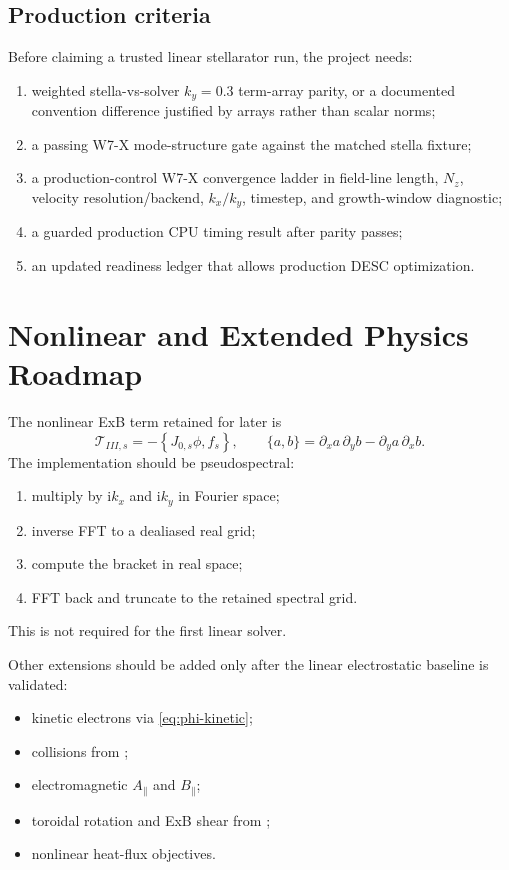 \documentclass[11pt,a4paper]{article}
\newcommand{\ii}{\mathrm{i}}
\begin{document}
\subsection{Production criteria}

Before claiming a trusted linear stellarator run, the project needs:
\begin{enumerate}
  \item weighted stella-vs-solver \(k_y=0.3\) term-array parity, or a documented
  convention difference justified by arrays rather than scalar norms;
  \item a passing W7-X mode-structure gate against the matched stella fixture;
  \item a production-control W7-X convergence ladder in field-line length,
  \(N_z\), velocity resolution/backend, \(k_x/k_y\), timestep, and growth-window
  diagnostic;
  \item a guarded production CPU timing result after parity passes;
  \item an updated readiness ledger that allows production DESC optimization.
\end{enumerate}


\section{Nonlinear and Extended Physics Roadmap}
\label{sec:nonlinear-extension}

The nonlinear ExB term retained for later is
\begin{equation}
  \mathcal{T}_{III,s}
  =
  -\left\{J_{0,s}\phi,f_s\right\},
  \qquad
  \{a,b\}
  =
  \partial_x a\,\partial_y b-\partial_y a\,\partial_x b.
  \label{eq:nonlinear-bracket}
\end{equation}
The implementation should be pseudospectral:
\begin{enumerate}
  \item multiply by \(\ii k_x\) and \(\ii k_y\) in Fourier space;
  \item inverse FFT to a dealiased real grid;
  \item compute the bracket in real space;
  \item FFT back and truncate to the retained spectral grid.
\end{enumerate}
This is not required for the first linear solver.

Other extensions should be added only after the linear electrostatic baseline is validated:
\begin{itemize}
  \item kinetic electrons via \eqref{eq:phi-kinetic};
  \item collisions from ;
  \item electromagnetic \(A_\parallel\) and \(B_\parallel\);
  \item toroidal rotation and ExB shear from ;
  \item nonlinear heat-flux objectives.
\end{itemize}
\end{document}
